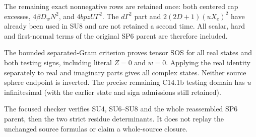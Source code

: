 The remaining exact nonnegative rows are retained once: both
centered cap excesses, $4\beta D_wN^2$, and
$4bpzU\Gamma^2$.  The $d\Gamma^2$ part and
$2(2D+1)(uX_e)^2$ have already been used in SU8 and are not
retained a second time.  All scalar, hard and first-normal terms
of the original SP6 parent are therefore included.

The bounded separated-Gram criterion proves tensor SOS for all real
states and both testing signs, including literal $Z=0$ and $w=0$.
Applying the real identity separately to real and imaginary parts
gives all complex states.  Neither source sphere endpoint is inverted.
The precise remaining C14.1b testing domain has $u$ infinitesimal
(with the earlier state and sign admissions still retained).

The focused checker verifies SU4, SU6--SU8 and the whole reassembled
SP6 parent, then the two strict residue determinants.  It does not
replay the unchanged source formulas or claim a whole-source closure.
